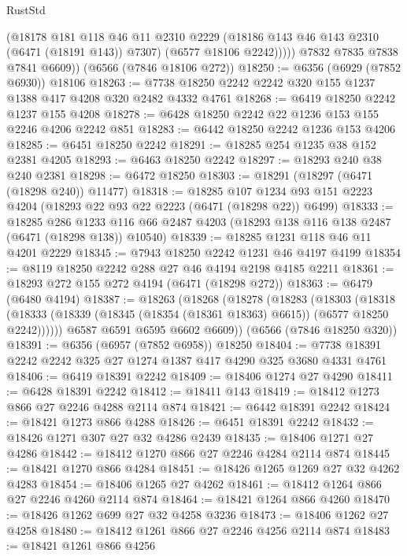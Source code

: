 \begin{lexlean}{RustStd}
\begin{coremodule}
              (@18178
                @181
                @118
                @46
                @11
                @2310
                @2229
                (@18186 @143 @46 @143 @2310 (@6471 (@18191 @143)) @7307)
                (@6577 @18106 @2242)))))
        @7832
        @7835
        @7838
        @7841
        @6609))
    (@6566 (@7846 @18106 @272))
@18250 := @6356 (@6929 (@7852 @6930)) @18106
@18263 := @7738 @18250 @2242 @2242 @320 @155 @1237 @1388 @417 @4208 @320 @2482 @4332 @4761
@18268 := @6419 @18250 @2242 @1237 @155 @4208
@18278 := @6428 @18250 @2242 @22 @1236 @153 @155 @2246 @4206 @2242 @851
@18283 := @6442 @18250 @2242 @1236 @153 @4206
@18285 := @6451 @18250 @2242
@18291 := @18285 @254 @1235 @38 @152 @2381 @4205
@18293 := @6463 @18250 @2242
@18297 := @18293 @240 @38 @240 @2381
@18298 := @6472 @18250
@18303 := @18291 (@18297 (@6471 (@18298 @240)) @11477)
@18318 := @18285
    @107
    @1234
    @93
    @151
    @2223
    @4204
    (@18293 @22 @93 @22 @2223 (@6471 (@18298 @22)) @6499)
@18333 := @18285
    @286
    @1233
    @116
    @66
    @2487
    @4203
    (@18293 @138 @116 @138 @2487 (@6471 (@18298 @138)) @10540)
@18339 := @18285 @1231 @118 @46 @11 @4201 @2229
@18345 := @7943 @18250 @2242 @1231 @46 @4197 @4199
@18354 := @8119 @18250 @2242 @288 @27 @46 @4194 @2198 @4185 @2211
@18361 := @18293 @272 @155 @272 @4194 (@6471 (@18298 @272))
@18363 := @6479 (@6480 @4194)
@18387 := @18263
    (@18268
      (@18278
        (@18283
          (@18303
            (@18318
              (@18333 (@18339 (@18345 (@18354 (@18361 @18363) @6615)) (@6577 @18250 @2242))))))
        @6587
        @6591
        @6595
        @6602
        @6609))
    (@6566 (@7846 @18250 @320))
@18391 := @6356 (@6957 (@7852 @6958)) @18250
@18404 := @7738 @18391 @2242 @2242 @325 @27 @1274 @1387 @417 @4290 @325 @3680 @4331 @4761
@18406 := @6419 @18391 @2242
@18409 := @18406 @1274 @27 @4290
@18411 := @6428 @18391 @2242
@18412 := @18411 @143
@18419 := @18412 @1273 @866 @27 @2246 @4288 @2114 @874
@18421 := @6442 @18391 @2242
@18424 := @18421 @1273 @866 @4288
@18426 := @6451 @18391 @2242
@18432 := @18426 @1271 @307 @27 @32 @4286 @2439
@18435 := @18406 @1271 @27 @4286
@18442 := @18412 @1270 @866 @27 @2246 @4284 @2114 @874
@18445 := @18421 @1270 @866 @4284
@18451 := @18426 @1265 @1269 @27 @32 @4262 @4283
@18454 := @18406 @1265 @27 @4262
@18461 := @18412 @1264 @866 @27 @2246 @4260 @2114 @874
@18464 := @18421 @1264 @866 @4260
@18470 := @18426 @1262 @699 @27 @32 @4258 @3236
@18473 := @18406 @1262 @27 @4258
@18480 := @18412 @1261 @866 @27 @2246 @4256 @2114 @874
@18483 := @18421 @1261 @866 @4256

\end{coremodule}
\end{lexlean}
